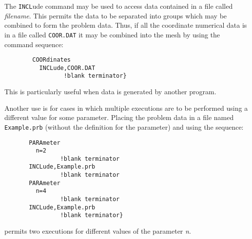 \headb

The {\tt INCL}ude command may be used to access data contained
in a file called {\it filename}.  This permits the data to be
separated into groups which may be combined to form the problem
data.  Thus, if all the coordinate numerical data is in a file
called {\tt COOR.DAT} it may be combined into the mesh by using the
command sequence:

\begin{verbatim}
        COORdinates
          INCLude,COOR.DAT
                 !blank terminator}
\end{verbatim}

This is particularly useful when data is generated by another program.

Another use is for cases in which multiple executions are to be performed
using a different value for some parameter.  Placing the problem data
in a file named {\tt Example.prb} (without the definition for the parameter)
and using the sequence:
\begin{verbatim}
       PARAmeter
         n=2
                !blank terminator
       INCLude,Example.prb
                !blank terminator
       PARAmeter
         n=4
                !blank terminator
       INCLude,Example.prb
                !blank terminator}
\end{verbatim}
permits two executions for different values of the parameter {\it n}.
\vfil\eject
